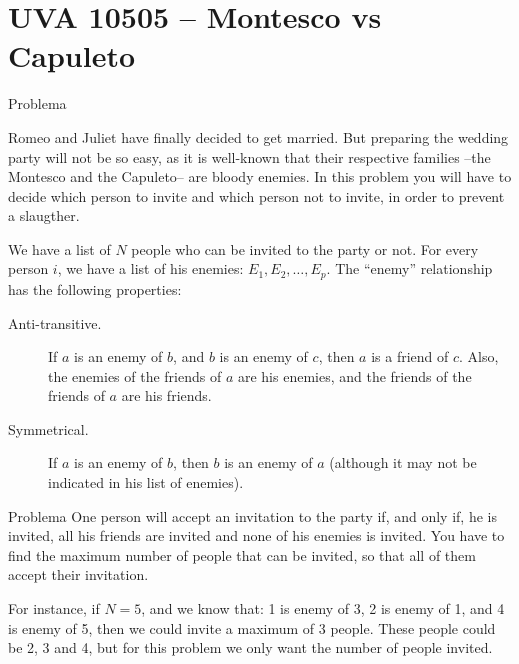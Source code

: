 \section{UVA 10505 -- Montesco vs Capuleto}

\begin{frame}[fragile]{Problema}

Romeo and Juliet have finally decided to get married. But preparing the wedding party will not be
so easy, as it is well-known that their respective families --the Montesco and the Capuleto-- are 
bloody enemies. In this problem you will have to decide which person to invite and which person 
not to invite, in order to prevent a slaugther.

We have a list of $N$ people who can be invited to the party or not. For every person $i$, we have 
a list of his enemies: $E_1, E_2, \ldots, E_p$. The “enemy” relationship has the following 
properties:

\begin{description}
    \item [Anti-transitive.] If $a$ is an enemy of $b$, and $b$ is an enemy of $c$, then $a$ is a 
        friend of $c$. Also, the enemies of the friends of $a$ are his enemies, and the friends of 
        the friends of $a$ are his friends.

    \item [Symmetrical.] If $a$ is an enemy of $b$, then $b$ is an enemy of $a$ (although it may 
        not be indicated in his list of enemies).
\end{description}

\end{frame}

\begin{frame}[fragile]{Problema}
One person will accept an invitation to the party if, and only if, he is invited, all his friends 
are invited and none of his enemies is invited. You have to find the maximum number of people that 
can be invited, so that all of them accept their invitation.

For instance, if $N = 5$, and we know that: 1 is enemy of 3, 2 is enemy of 1, and 4 is enemy of 5,
then we could invite a maximum of 3 people. These people could be 2, 3 and 4, but for this problem
we only want the number of people invited.

\end{frame}

